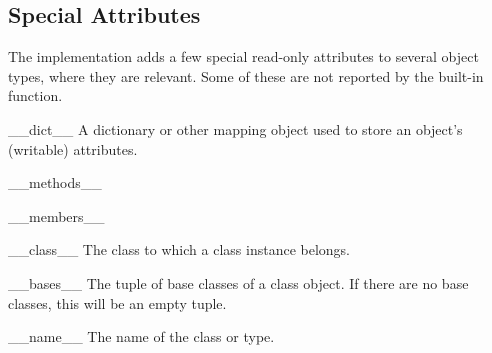 \subsection{Special Attributes \label{specialattrs}}

The implementation adds a few special read-only attributes to several
object types, where they are relevant.  Some of these are not reported
by the  built-in function.

\begin{memberdesc}[object]{__dict__}
A dictionary or other mapping object used to store an
object's (writable) attributes.
\end{memberdesc}

\begin{memberdesc}[object]{__methods__}
\end{memberdesc}

\begin{memberdesc}[object]{__members__}
\end{memberdesc}

\begin{memberdesc}[instance]{__class__}
The class to which a class instance belongs.
\end{memberdesc}

\begin{memberdesc}[class]{__bases__}
The tuple of base classes of a class object.  If there are no base
classes, this will be an empty tuple.
\end{memberdesc}

\begin{memberdesc}[class]{__name__}
The name of the class or type.
\end{memberdesc}
